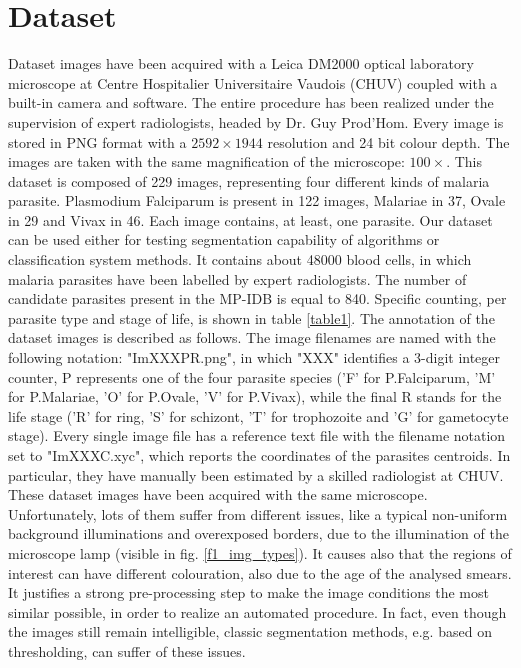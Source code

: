 \documentclass[final,a4paper,12pt,english]{UnicaPhdThesis3}
\begin{document}
	\section{Dataset}
	Dataset images have been acquired with a Leica DM2000 optical laboratory microscope at Centre Hospitalier Universitaire Vaudois (CHUV) coupled with a built-in camera and software. The entire procedure has been realized under the supervision of expert radiologists, headed by Dr. Guy Prod'Hom. Every image is stored in PNG format with a $2592\times1944$ resolution and 24 bit colour depth. The images are taken with the same magnification of the microscope: $100\times$.
	This dataset is composed of 229 images, representing four different kinds of malaria parasite. Plasmodium Falciparum is present in 122 images, Malariae in 37, Ovale in 29 and Vivax in 46. Each image contains, at least, one parasite. Our dataset can be used either for testing segmentation capability of algorithms or classification system methods. 
	It contains about 48000 blood cells, in which malaria parasites have been labelled by expert radiologists. The number of candidate parasites present in the MP-IDB is equal to 840. Specific counting, per parasite type and stage of life, is shown in table \ref{table1}.
	The annotation of the dataset images is described as follows. The image filenames are named with the following notation: "ImXXXPR.png", in which "XXX" identifies a 3-digit integer counter, P represents one of the four parasite species ('F' for P.Falciparum, 'M' for P.Malariae, 'O' for P.Ovale, 'V' for P.Vivax), while the final R stands for the life stage ('R' for ring, 'S' for schizont, 'T' for trophozoite and 'G' for gametocyte stage). Every single image file has a reference text file with the filename notation set to "ImXXXC.xyc", which reports the coordinates of the parasites centroids. In particular, they have manually been estimated by a skilled radiologist at CHUV. 
	These dataset images have been acquired with the same microscope. Unfortunately, lots of them suffer from different issues, like a typical non-uniform background illuminations and overexposed borders, due to the illumination of the microscope lamp (visible in fig. \ref{f1_img_types}). It causes also that the regions of interest can have different colouration, also due to the age of the analysed smears. It justifies a strong pre-processing step to make the image conditions the most similar possible, in order to realize an automated procedure. In fact, even though the images still remain intelligible, classic segmentation methods, e.g. based on thresholding, can suffer of these issues.
	
\end{document}

